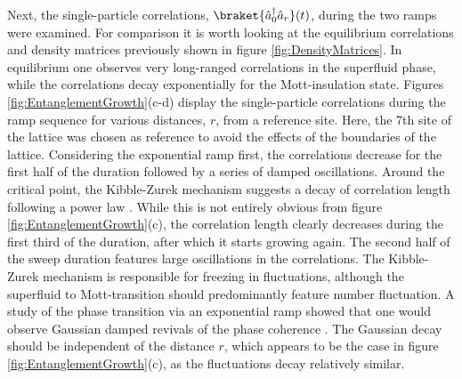 Next, the single-particle correlations, $\braket{\hat{a}_{0}^{\dag} \hat{a}_{r}}(t)$, during the two ramps were examined. For comparison it is worth looking at the equilibrium correlations and density matrices previously shown in figure \ref{fig:DensityMatrices}. In equilibrium one observes very long-ranged correlations in the superfluid phase, while the correlations decay exponentially for the Mott-insulation state. Figures \ref{fig:EntanglementGrowth}(c-d) display the single-particle correlations during the ramp sequence for various distances, $r$, from a reference site. Here, the 7th site of the lattice was chosen as reference to avoid the effects of the boundaries of the lattice.
Considering the exponential ramp first, the correlations decrease for the first half of the duration followed by a series of damped oscillations. Around the critical point, the Kibble-Zurek mechanism suggests a decay of correlation length following a power law \cite{Zurek2005}. While this is not entirely obvious from figure \ref{fig:EntanglementGrowth}(c), the correlation length clearly decreases during the first third of the duration, after which it starts growing again. The second half of the sweep duration features large oscillations in the correlations. The Kibble-Zurek mechanism is responsible for freezing in fluctuations, although the superfluid to Mott-transition should predominantly feature number fluctuation. A study of the phase transition via an exponential ramp showed that one would observe Gaussian damped revivals of the phase coherence \cite{Schutzhold2006}. The Gaussian decay should be independent of the distance $r$, which appears to be the case in figure \ref{fig:EntanglementGrowth}(c), as the fluctuations decay relatively similar.


